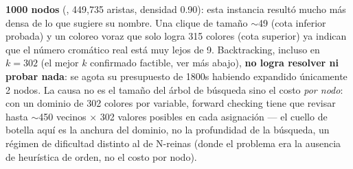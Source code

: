 \textbf{1000 nodos} (, 449{,}735 aristas, densidad 0.90): esta instancia
resultó mucho más densa de lo que sugiere su nombre. Una clique de tamaño $\sim$49 (cota
inferior probada) y un coloreo voraz que solo logra 315 colores (cota superior) ya indican que
el número cromático real está muy lejos de 9. Backtracking, incluso en $k=302$ (el mejor $k$
confirmado factible, ver más abajo), \textbf{no logra resolver ni probar nada}: se agota su
presupuesto de 1800s habiendo expandido únicamente 2 nodos. La causa no es el tamaño del árbol
de búsqueda sino el costo \emph{por nodo}: con un dominio de 302 colores por variable, forward
checking tiene que revisar hasta $\sim$450 vecinos $\times$ 302 valores posibles en cada
asignación --- el cuello de botella aquí es la anchura del dominio, no la profundidad de la
búsqueda, un régimen de dificultad distinto al de N-reinas (donde el problema era la ausencia de
heurística de orden, no el costo por nodo).
